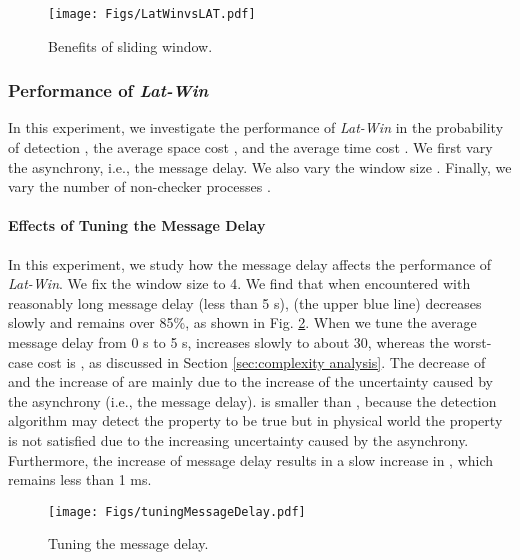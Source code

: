 \documentclass[12pt,journal,letterpaper,compsoc]{IEEEtran}
\begin{document}
\begin{figure}[htbp]
\begin{center}
  \texttt{[image: Figs/LatWinvsLAT.pdf]}\\
  \centering\parbox[c]{2.5in}{\caption{Benefits of sliding window.}}
  \label{F:trade-off}
\end{center}
\end{figure}

\subsubsection{Performance of {\it Lat-Win}}

In this experiment, we investigate the performance of {\it Lat-Win} in the probability of detection , the average space cost , and the average time cost . We first vary the asynchrony, i.e., the message delay. We also vary the window size . Finally, we vary the number of non-checker processes .

\paragraph{Effects of Tuning the Message Delay}

In this experiment, we study how the message delay affects the performance of {\it Lat-Win}. We fix the window size  to 4. We find that when encountered with reasonably long message delay (less than 5 s),  (the upper blue line) decreases slowly and remains over 85\%, as shown in Fig. \ref{F:message-delay}. When we tune the average message delay from 0 s to 5 s,  increases slowly to about 30, whereas the worst-case cost is , as discussed in Section \ref{sec:complexity analysis}. The decrease of  and the increase of  are mainly due to the increase of the uncertainty caused by the asynchrony (i.e., the message delay).  is smaller than , because the detection algorithm may detect the property to be true but in physical world the property is not satisfied due to the increasing uncertainty caused by the asynchrony. Furthermore, the increase of message delay results in a slow increase in , which remains less than 1 ms.

\begin{figure}[htbp]
\begin{center}
  \texttt{[image: Figs/tuningMessageDelay.pdf]}\\
  \centering\parbox[c]{2.5in}{\caption{Tuning the message delay.}}
  \label{F:message-delay}
\end{center}
\end{figure}
\end{document}

